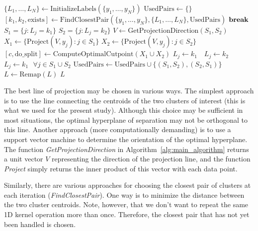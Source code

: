 \documentclass[10pt]{article}
\begin{document}
\begin{algorithm}
\caption{}
\begin{algorithmic}
\State $\{L_1,\dots,L_N\} \gets \text{InitializeLabels} (\{y_1,\dots,y_N\})$
\State $\text{UsedPairs} \gets \{\}$
\Loop
	\State $[k_1,k_2,\text{exists}] \gets \text{FindClosestPair}(\{y_1,\dots,y_N\},\{L_1,\dots,L_N\},\text{UsedPairs})$
	 
		\State $\text{\textbf{break}}$ 
	\EndIf
	\State $S_1=\{j: L_j=k_1\}$
	\State $S_2=\{j: L_j=k_2\}$
	\State $V \gets \text{GetProjectionDirection}(S_1,S_2)$
	\State $X_1 \gets \{\text{Project}(V,y_j): j\in S_1\}$
	\State $X_2 \gets \{\text{Project}(V,y_j): j\in S_2\}$
	\State $[c,\text{do\_split}] \gets \text{ComputeOptimalCutpoint}(X_1\cup X_2)$
	 
				$L_j \gets k_1$
			\Else
				$\text{ }L_j \gets k_2$
			\EndIf
		\EndFor
	\Else {}
		\State $L_j\gets k_1 \text{ }\forall j\in S_1\cup S_2$ 
	\EndIf
	\State $\text{UsedPairs}\gets\text{UsedPairs}\cup\{(S_1,S_2),(S_2,S_1)\}$
        \EndLoop
\State{}
\State $L\gets \text{Remap}(L)$
\State \Return $L$
\EndFunction
\end{algorithmic}
\label{alg:main_algorithm}
\end{algorithm}

The best line of projection may be chosen in various ways. The simplest approach is to use the line connecting the centroids of the two clusters of interest (this is what we used for the present study). Although this choice may be sufficient in most situations, the optimal hyperplane of separation may not be orthogonal to this line. Another approach (more computationally demanding) is to use a support vector machine to determine the orientation of the optimal hyperplane. The function \emph{GetProjectionDirection} in Algorithm~\ref{alg:main_algorithm} returns a unit vector $V$ representing the direction of the projection line, and the function \emph{Project} simply returns the inner product of this vector with each data point.

Similarly, there are various approaches for choosing the closest pair of clusters at each iteration (\emph{FindClosestPair}). One way is to minimize the distance between the two cluster centroids. Note, however, that we don't want to repeat the same 1D kernel operation more than once. Therefore, the closest pair that has not yet been handled is chosen.
\end{document}
